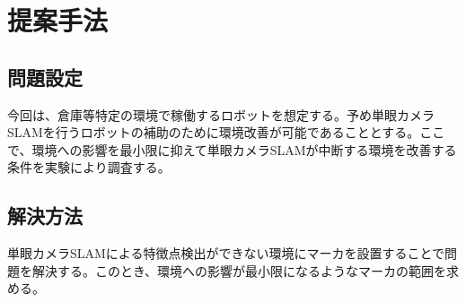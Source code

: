\chapter{提案手法}\label{chap:method}

\section{問題設定}

今回は、倉庫等特定の環境で稼働するロボットを想定する。予め単眼カメラSLAMを行うロボットの補助のために環境改善が可能であることとする。ここで、環境への影響を最小限に抑えて単眼カメラSLAMが中断する環境を改善する条件を実験により調査する。

\section{解決方法}

単眼カメラSLAMによる特徴点検出ができない環境にマーカを設置することで問題を解決する。このとき、環境への影響が最小限になるようなマーカの範囲を求める。
